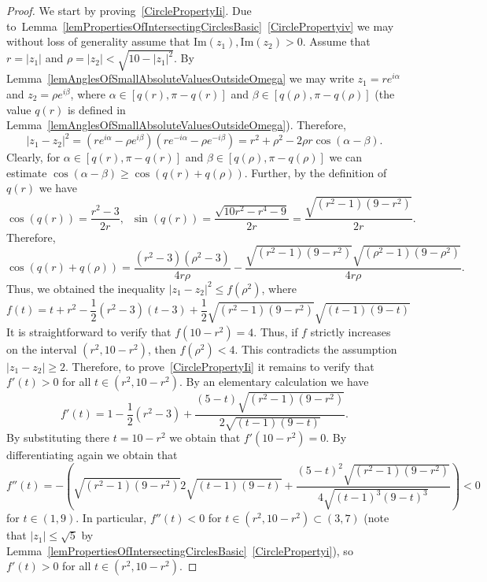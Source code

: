 \documentclass{amsart}
\numberwithin{equation}{section}
\theoremstyle{definition}
\theoremstyle{remark}
\begin{document}
	\begin{proof}	
		We start by proving~\ref{CirclePropertyIi}. Due to~Lemma~\ref{lemPropertiesOfIntersectingCirclesBasic}~\ref{CirclePropertyiv} we may without loss of generality assume that $\mathrm{Im}(z_1), \mathrm{Im}(z_2) > 0$. Assume that $r = |z_1|$ and $\rho = |z_2| < \sqrt{10 - |z_1|^2}$. By Lemma~\ref{lemAnglesOfSmallAbsoluteValuesOutsideOmega} we may write $z_1 = re^{i\alpha}$ and $z_2 = \rho e^{i\beta}$, where $\alpha \in [q(r), \pi - q(r)]$ and $\beta \in [q(\rho), \pi - q(\rho)]$ (the value $q(r)$ is defined in Lemma~\ref{lemAnglesOfSmallAbsoluteValuesOutsideOmega}). Therefore, 
		\[
		|z_1 - z_2|^2 = (r e^{i\alpha} - \rho e^{i\beta})(r e^{-i\alpha} - \rho e^{-i\beta}) = r^2 + \rho^2 - 2\rho r \cos(\alpha - \beta).
		\]
		Clearly, for $\alpha \in [q(r), \pi - q(r)]$ and $\beta \in [q(\rho), \pi - q(\rho)]$ we can estimate $\cos(\alpha - \beta) \ge \cos(q(r) + q(\rho))$. Further, by the definition of $q(r)$ we have
		\[
		\cos(q(r)) = \dfrac{r^2 - 3}{2r}, \;\;\sin(q(r)) = \dfrac{\sqrt{10r^2 - r^4 - 9}}{2r} = \dfrac{\sqrt{(r^2 -1)(9 - r^2)}}{2r}.
		\]
		Therefore, 
		\[
		\cos(q(r) + q(\rho)) = \dfrac{(r^2 - 3)(\rho^2 - 3)}{4r\rho} - \dfrac{\sqrt{(r^2 -1)(9 - r^2)}\sqrt{(\rho^2 -1)(9 - \rho^2)}}{4r\rho}.
		\]
		Thus, we obtained the inequality $|z_1 - z_2|^2 \le f(\rho^2)$, where
		\[
		f(t) = t + r^2 - \dfrac{1}{2}(r^2 - 3)(t - 3) + \dfrac{1}{2}\sqrt{(r^2 -1)(9 - r^2)}\sqrt{(t -1)(9 - t)}
		\]
		It is straightforward to verify that $f(10 - r^2) = 4$. Thus, if $f$ strictly increases on the interval $(r^2, 10 - r^2)$, then $f(\rho^2) < 4$. This contradicts the assumption $|z_1 - z_2| \ge 2$. Therefore, to prove~\ref{CirclePropertyIi} it remains to verify that $f'(t) > 0$ for all $t \in (r^2, 10 - r^2)$. By an elementary calculation we have
		\[
		f'(t) = 1 - \dfrac{1}{2}(r^2 - 3) + \dfrac{(5 - t)\sqrt{(r^2 -1)(9 - r^2)}}{2\sqrt{(t -1)(9 - t)}}.
		\]
		By substituting there $t = 10 - r^2$ we obtain that $f'(10 - r^2) = 0$. By differentiating again we obtain that
		\[
		f''(t) = -\left({\sqrt{(r^2 -1)(9 - r^2)}}{2\sqrt{(t -1)(9 - t)}} + \dfrac{(5 - t)^2\sqrt{(r^2 -1)(9 - r^2)}}{4\sqrt{(t -1)^3(9 - t)^3}}\right) < 0
		\]
		for $t \in (1, 9)$. In particular, $f''(t) < 0$ for $t \in (r^2, 10 - r^2) \subset (3, 7)$ (note that $|z_1| \le \sqrt{5}$ by Lemma~\ref{lemPropertiesOfIntersectingCirclesBasic}~\ref{CirclePropertyi}), so $f'(t) > 0$ for all $t \in (r^2, 10 -r^2)$.
		

\end{proof}
\end{document}
